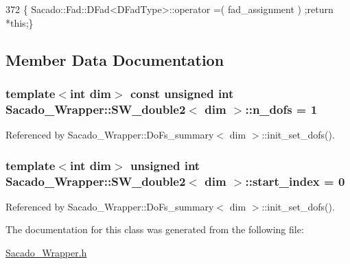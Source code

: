 \begin{DoxyCode}
372 \{ Sacado::Fad::DFad<DFadType>::operator =( fad\_assignment ) ;\textcolor{keywordflow}{return} *\textcolor{keyword}{this};\}
\end{DoxyCode}


\subsection{Member Data Documentation}
\subsubsection[{\texorpdfstring{n\+\_\+dofs}{n_dofs}}]{\setlength{\rightskip}{0pt plus 5cm}template$<$int dim$>$ const unsigned int {\bf Sacado\+\_\+\+Wrapper\+::\+S\+W\+\_\+double2}$<$ dim $>$\+::n\+\_\+dofs = 1\hspace{0.3cm}{\ttfamily [static]}}\hypertarget{classSacado__Wrapper_1_1SW__double2_a535aa77392e896e21151bfc63f92e020}{}\label{classSacado__Wrapper_1_1SW__double2_a535aa77392e896e21151bfc63f92e020}


Referenced by Sacado\+\_\+\+Wrapper\+::\+Do\+Fs\+\_\+summary$<$ dim $>$\+::init\+\_\+set\+\_\+dofs().

\subsubsection[{\texorpdfstring{start\+\_\+index}{start_index}}]{\setlength{\rightskip}{0pt plus 5cm}template$<$int dim$>$ unsigned int {\bf Sacado\+\_\+\+Wrapper\+::\+S\+W\+\_\+double2}$<$ dim $>$\+::start\+\_\+index = 0}\hypertarget{classSacado__Wrapper_1_1SW__double2_ae7327540ad1fd725ea78ffc2268b423a}{}\label{classSacado__Wrapper_1_1SW__double2_ae7327540ad1fd725ea78ffc2268b423a}


Referenced by Sacado\+\_\+\+Wrapper\+::\+Do\+Fs\+\_\+summary$<$ dim $>$\+::init\+\_\+set\+\_\+dofs().



The documentation for this class was generated from the following file\+:\begin{DoxyCompactItemize}
\item 
\hyperlink{Sacado__Wrapper_8h}{Sacado\+\_\+\+Wrapper.\+h}\end{DoxyCompactItemize}
